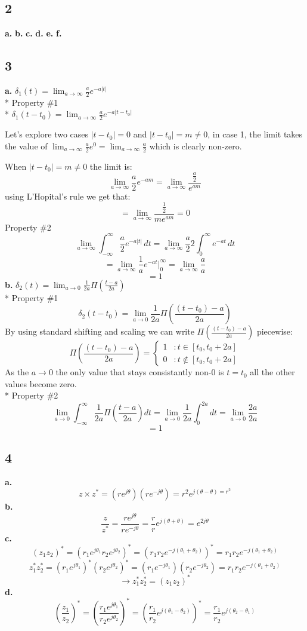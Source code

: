 \documentclass[10pt, letterpaper]{article}
\begin{document}
\subsection*{2}

\textbf{a.}
\textbf{b.}
\textbf{c.}
\textbf{d.}
\textbf{e.}
\textbf{f.}
\subsection*{3}
\textbf{a.}
$\delta_1(t) = \lim_{a \to \infty} \frac{a}{2} e^{-a|t|}$\\*
Property \#1 \\*
$\delta_1(t - t_0) = \lim_{a \to \infty} \frac{a}{2} e^{-a|t - t_0|}$

Let's explore two cases $|t - t_0| = 0$ and $|t - t_0| = m \neq 0$, in case 1, 
the limit takes the value of $\lim_{a \to \infty} \frac{a}{2} e^{0} = \lim_{a \to \infty} \frac{a}{2}$ 
which is clearly non-zero.

When $|t - t_0| = m \neq 0$ the limit is:
\[
\lim_{a \to \infty} \frac{a}{2} e^{-am} = 
\lim_{a \to \infty} \frac{\frac{a}{2} }{e^{am}}
\]
using L'Hopital's rule we get that:
\[ =
\lim_{a \to \infty} \frac{\frac{1}{2} }{me^{am}} = 0
\]
Property \#2
\[
\lim_{a \to \infty} \int_{-\infty}^{\infty}\frac{a}{2} e^{-a|t|}\,dt = 
\lim_{a \to \infty} \frac{a}{2} 2 \int_{0}^{\infty} e^{-at}\,dt 
\]
\[
= \lim_{a \to \infty} \frac{1}{a} e^{-at} |_{0}^{\infty}
= \lim_{a \to \infty} \frac{a}{a}
\]
\[= 1\]
\textbf{b.}
$\delta_2(t) = \lim_{a \to 0} \frac{1}{2a} \Pi(\frac{t - a}{2a})$\\*
Property \#1
\[
\delta_2(t - t_0) = \lim_{a \to 0} \frac{1}{2a} \Pi(\frac{(t -t_0) - a}{2a})
\]
By using standard shifting and scaling we can write $\Pi(\frac{(t -t_0) - a}{2a})$ piecewise:
\[\Pi(\frac{(t -t_0) - a}{2a}) = \left\{
  \begin{array}{lr}
    1 & : t \in [t_0, t_0 + 2a]\\
    0 & : t \not\in [t_0, t_0 + 2a]
  \end{array}
\right.
\]
As the $a \to 0$ the only value that stays consistantly non-0 is $t = t_0$
all the other values become zero.
\\*
Property \#2
\[
\lim_{a \to 0} \int_{-\infty}^{\infty}\frac{1}{2a} \Pi(\frac{t - a}{2a})dt = 
\lim_{a \to 0} \frac{1}{2a} \int_{0}^{2a}dt 
= \lim_{a \to 0} \frac{2a}{2a} 
\]
\[= 1\]
\subsection*{4}
\textbf{a.}
\[z \times z^* = (re^{j\theta})(re^{-j\theta}) = r^2 e^{j(\theta - \theta) = r^2} \]
\textbf{b.}
\[ \frac{z}{z^*} = \frac{re^{j\theta}}{re^{-j\theta}} = \frac{r}{r} e^{j (\theta + \theta)} = e^{2j\theta} \]
\textbf{c.}
\[(z_1 z_2)^* = (r_1 e^{j \theta_1} r_2 e^{j \theta_2})^* = (r_1 r_2 e^{-j(\theta_1 + \theta_2)})^* = r_1 r_2 e^{-j(\theta_1 + \theta_2)}\]
\[z_1^* z_2^* = (r_1e^{j\theta_1})^* (r_2e^{j\theta_2})^* = (r_1e^{-j\theta_1}) (r_2e^{-j\theta_2})  = r_1 r_2 e^{-j(\theta_1 + \theta_2)} \]
\[\rightarrow z_1^* z_2^* = (z_1 z_2)^*\]
\textbf{d.}
\[
(\frac{z_1}{z_2})^*  = (\frac{r_1e^{j\theta_1}}{r_2e^{j\theta_2}})^* =   (\frac{r_1}{r_2} e^{j(\theta_1 - \theta_2)})^* =     
\frac{r_1}{r_2} e^{j(\theta_2 - \theta_1)}
\]
\end{document}
